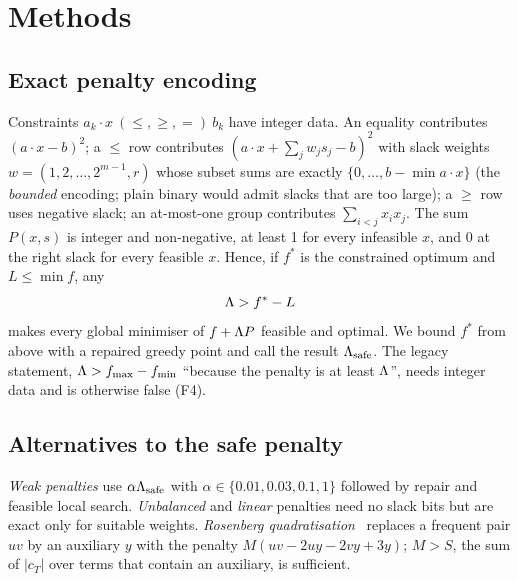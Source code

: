 \documentclass[conference]{IEEEtran}
\begin{document}
\begin{table}[!t]
\centering\caption{Findings of the legacy audit (F1--F7).}\label{tab:audit}
\scriptsize
\end{table}

\section{Methods}\label{sec:methods}
\subsection{Exact penalty encoding}
Constraints $a_k\cdot x\ (\le,\ge,=)\ b_k$ have integer data. An equality contributes
$(a\cdot x-b)^2$; a $\le$ row contributes $(a\cdot x+\sum_j w_js_j-b)^2$ with slack weights
$w=(1,2,\dots,2^{m-1},r)$ whose subset sums are exactly $\{0,\dots,b-\min a\cdot x\}$ (the
\emph{bounded} encoding; plain binary would admit slacks that are too large); a $\ge$ row uses
negative slack; an at-most-one group contributes $\sum_{i<j}x_ix_j$. The sum $P(x,s)$ is integer
and non-negative, at least 1 for every infeasible $x$, and 0 at the right slack for every feasible
$x$. Hence, if $f^\ast$ is the constrained optimum and $L\le\min f$, any
\begin{equation}
\Lambda>f^\ast-L
\end{equation}
makes every global minimiser of $f+\Lambda P$ feasible and optimal. We bound $f^\ast$ from above with
a repaired greedy point and call the result $\Lambda_{\mathrm{safe}}$. The legacy statement, $\Lambda>f_{\max}-f_{\min}$
``because the penalty is at least $\Lambda$'', needs integer data and is otherwise false (F4).

\subsection{Alternatives to the safe penalty}
\emph{Weak penalties} use $\alpha\Lambda_{\mathrm{safe}}$ with $\alpha\in\{0.01,0.03,0.1,1\}$ followed by repair and
feasible local search. \emph{Unbalanced} and \emph{linear} penalties need no slack bits but are exact
only for suitable weights. \emph{Rosenberg quadratisation}~\cite{rosenberg1975,boros2002} replaces
a frequent pair $uv$ by an auxiliary $y$ with the penalty $M(uv-2uy-2vy+3y)$; $M>S$, the sum of
$|c_T|$ over terms that contain an auxiliary, is sufficient.
\end{document}
